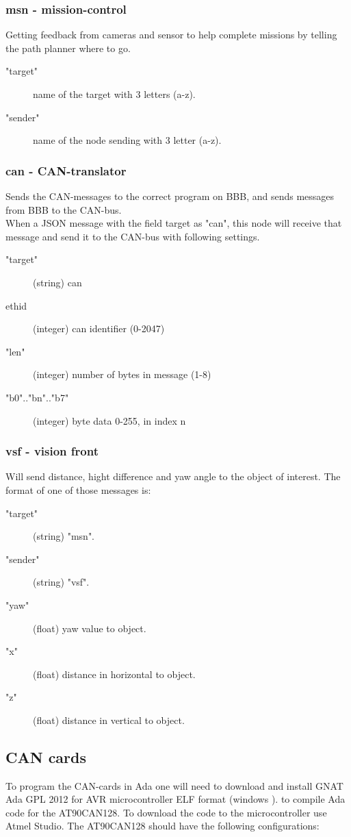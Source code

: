\subsubsection{msn - mission-control}
Getting feedback from cameras and sensor to help complete missions by telling the path planner where to go.
\begin{description}
  \item["target"] name of the target with 3 letters (a-z).
  \item["sender"] name of the node sending  with 3 letter (a-z).
\end{description}

\subsubsection{can - CAN-translator}
Sends the CAN-messages to the correct program on BBB, and sends messages from BBB to the CAN-bus.\\
When a JSON message with the field target as "can", this node will receive that message and send it to the CAN-bus with following settings.
\begin{description}
  \item["target"] (string) can
  \item[ethid] (integer) can identifier (0-2047)
  \item["len"] (integer) number of bytes in message (1-8)
  \item["b0".."bn".."b7"] (integer) byte data 0-255, in index n
\end{description}

\subsubsection{vsf - vision front}
Will send distance, hight difference and yaw angle to the object of interest.
The format of one of those messages is:
\begin{description}
  \item["target"] (string) "msn".
  \item["sender"] (string) "vsf".
  \item["yaw"] (float) yaw value to object.
  \item["x"] (float) distance in horizontal to object.
  \item["z"] (float) distance in vertical to object.
\end{description}

\subsection{CAN cards}
\noindent 
To program the CAN-cards in Ada one will need to download and install GNAT Ada GPL 2012 for AVR microcontroller ELF format (windows
)\cite{link_to_download}.  to compile Ada code for the AT90CAN128. To download the code to the microcontroller use Atmel Studio\cite{Atmel_Studio}.
The AT90CAN128 should have the following configurations:

